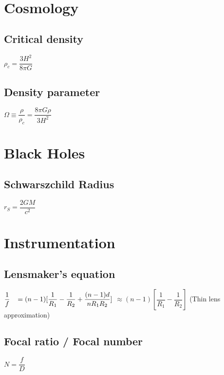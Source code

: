 \section{Cosmology}

\subsection{Critical density}

\begin{itemize}
    \itemt \( \rho_c = \dfrac{3H^2}{8\pi G} \)
\end{itemize}

\subsection{Density parameter}

\begin{itemize}
    \itemt \(\Omega \equiv \dfrac{\rho}{\rho_c} = \dfrac{8\pi G\rho}{3H^2}\)
\end{itemize}

\section{Black Holes}

\subsection{Schwarszchild Radius}		
\begin{itemize}
\itemt \( r_S = \dfrac{2GM}{c^2} \)
\end{itemize}

	\section{Instrumentation}

\subsection{Lensmaker's equation}
\begin{itemize}
\itemt \( \dfrac{1}{f} \hspace*{0.3cm} = (n-1)[\dfrac{1}{R_1} - \dfrac{1}{R_2}+\dfrac{(n-1)d}{nR_1R_2}] \)
\subitem \hspace*{0.85cm} \( \approx (n-1)[\dfrac{1}{R_1} - \dfrac{1}{R_2}] \) \tab     (Thin lens approximation)
\end{itemize}

\subsection{Focal ratio / Focal number}
\begin{itemize}
\itemt \( N = \dfrac{f}{D} \)
\end{itemize}			

